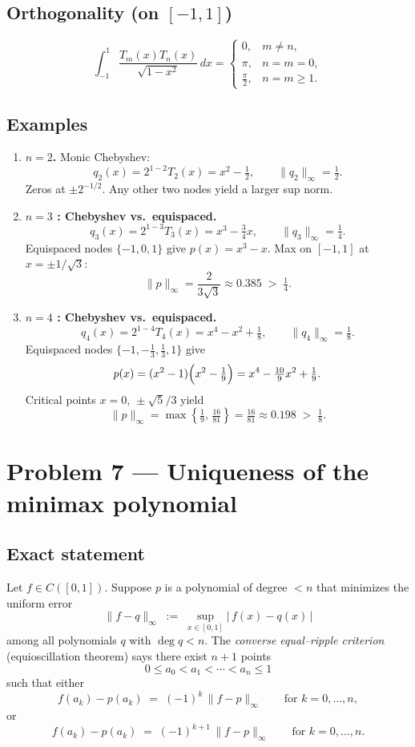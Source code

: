 \documentclass[12pt,a4paper]{article}
\theoremstyle{plain}
\theoremstyle{definition}
\theoremstyle{remark}
\theoremstyle{remark}
\begin{document}
\subsection*{Orthogonality (on $[-1,1]$)}
\[
\int_{-1}^{1}\frac{T_m(x)T_n(x)}{\sqrt{1-x^2}}\,dx=
\begin{cases}
	0,& m\ne n,\\[2pt]
	\pi,& n=m=0,\\[2pt]
	\frac{\pi}{2},& n=m\ge1.
\end{cases}
\]

\subsection*{Examples}

\begin{enumerate}\setlength{\itemsep}{0.6em}
	\item \textbf{$n=2$.}
	Monic Chebyshev:
	\[
	q_2(x)=2^{1-2}T_2(x)=x^2-\tfrac12,\qquad \|q_2\|_\infty=\tfrac12.
	\]
	Zeros at $\pm 2^{-1/2}$. Any other two nodes yield a larger sup norm.
	
	\item \textbf{$n=3$ : Chebyshev vs.\ equispaced.}
	\[
	q_3(x)=2^{1-3}T_3(x)=x^3-\tfrac34 x,\qquad \|q_3\|_\infty=\tfrac14.
	\]
	Equispaced nodes $\{-1,0,1\}$ give $p(x)=x^3-x$.
	Max on $[-1,1]$ at $x=\pm 1/\sqrt{3}$:
	\[
	\|p\|_\infty=\frac{2}{3\sqrt3}\approx 0.385\;>\;\tfrac14.
	\]
	
	\item \textbf{$n=4$ : Chebyshev vs.\ equispaced.}
	\[
	q_4(x)=2^{1-4}T_4(x)=x^4-x^2+\tfrac18,\qquad \|q_4\|_\infty=\tfrac18.
	\]
	Equispaced nodes $\{-1,-\tfrac13,\tfrac13,1\}$ give
	\[
	p(x)=(x^2-1)\Bigl(x^2-\tfrac{1}{9}\Bigr)=x^4-\tfrac{10}{9}x^2+\tfrac19.
	\]
	Critical points $x=0,\ \pm\sqrt{5}/3$ yield
	\[
	\|p\|_\infty=\max\left\{\tfrac{1}{9},\,\tfrac{16}{81}\right\}=\tfrac{16}{81}\approx 0.198
	\;>\;\tfrac18.
	\]
\end{enumerate}

\section*{Problem 7 — Uniqueness of the minimax polynomial}

\subsection*{Exact statement}

Let $f\in C([0,1])$. Suppose $p$ is a polynomial of degree $<n$ that minimizes the uniform error
\[
\|f-q\|_\infty \;:=\; \sup_{x\in[0,1]} |\,f(x)-q(x)\,|
\]
among all polynomials $q$ with $\deg q<n$.
The \emph{converse equal--ripple criterion} (equioscillation theorem) says there exist $n+1$ points
\[
0\le a_0 < a_1 < \cdots < a_n \le 1
\]
such that either
\[
f(a_k)-p(a_k) \;=\; (-1)^k\,\|f-p\|_\infty \qquad \text{for } k=0,\dots,n,
\]
or
\[
f(a_k)-p(a_k) \;=\; (-1)^{k+1}\,\|f-p\|_\infty \qquad \text{for } k=0,\dots,n.
\]
\end{document}
